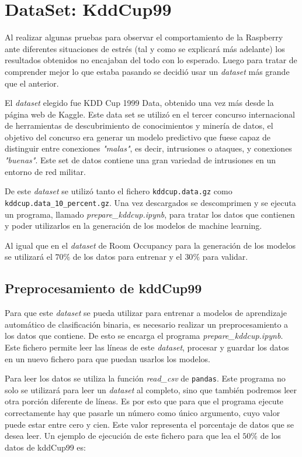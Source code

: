 \documentclass[a4paper, 12pt]{book}
\begin{document}
\section{DataSet: KddCup99}
\label{subsec:dataset_kddcup99}

Al realizar algunas pruebas para observar el comportamiento de la Raspberry ante diferentes situaciones de estrés (tal y como se explicará más adelante) los resultados obtenidos no encajaban del todo con lo esperado. Luego para tratar de comprender mejor lo que estaba pasando se decidió usar un \textit{dataset} más grande que el anterior.

El \textit{dataset} elegido fue KDD Cup 1999 Data\cite{DataSetKddCup99}, obtenido una vez más desde la página web de Kaggle. Este data set se utilizó en el tercer concurso internacional de herramientas de descubrimiento de conocimientos y minería de datos, el objetivo del concurso era generar un modelo predictivo que fuese capaz de distinguir entre conexiones \textit{"malas"}, es decir, intrusiones o ataques, y conexiones \textit{"buenas"}. Este set de datos contiene una gran variedad de intrusiones en un entorno de red militar. 

De este \textit{dataset} se utilizó tanto el fichero \texttt{kddcup.data.gz} como \\\texttt{kddcup.data\_10\_percent.gz}. Una vez descargados se descomprimen y se ejecuta un programa, llamado \textit{prepare\_kddcup.ipynb}, para tratar los datos que contienen y poder utilizarlos en la generación de los modelos de machine learning.

Al igual que en el \textit{dataset} de Room Occupancy para la generación de los modelos se utilizará el $70\%$ de los datos para entrenar y el $30\%$ para validar.

\subsection{Preprocesamiento de kddCup99}
\label{subsec:preprocesamiento_kddcup}

Para que este \textit{dataset} se pueda utilizar para entrenar a modelos de aprendizaje automático de clasificación binaria, es necesario realizar un preprocesamiento a los datos que contiene. De esto se encarga el programa \textit{prepare\_kddcup.ipynb}. Este fichero permite leer las líneas de este \textit{dataset}, procesar y guardar los datos en un nuevo fichero para que puedan usarlos los modelos.

Para leer los datos se utiliza la función \textit{read\_csv} de \texttt{pandas}. Este programa no solo se utilizará para leer un \textit{dataset} al completo, sino que también podremos leer otra porción diferente de líneas. Es por esto que para que el programa ejecute correctamente hay que pasarle un número como único argumento, cuyo valor puede estar entre cero y cien. Este valor representa el porcentaje de datos que se desea leer. Un ejemplo de ejecución de este fichero para que lea el $50\%$ de los datos de kddCup99 es:\\
\end{document}
